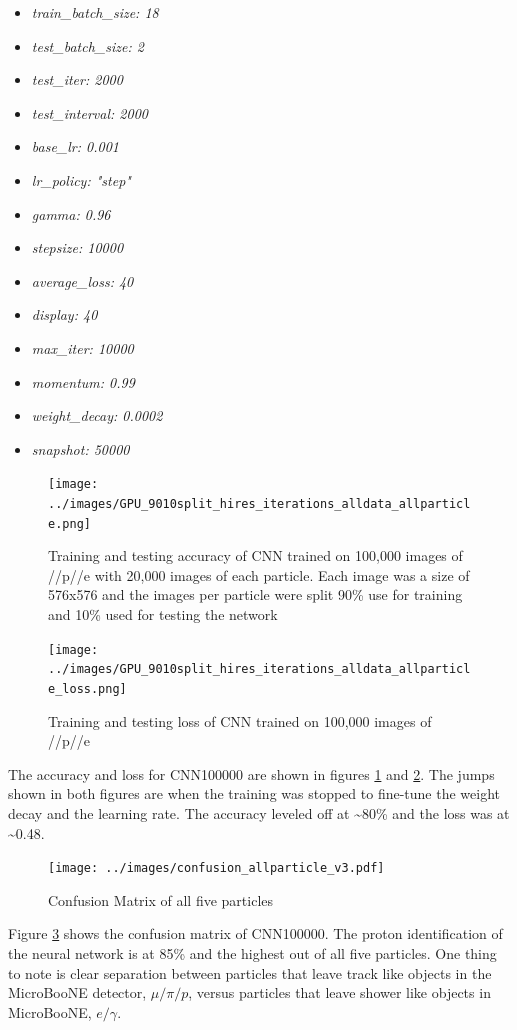 \begin{multicols}{3}
\begin{itemize}
 \item \textit{train{\_}batch{\_}size: 18}
 \item \textit{test{\_}batch{\_}size: 2}
 \item \textit{test{\_}iter: 2000}
 \item \textit{test{\_}interval: 2000}
 \item \textit{base{\_}lr: 0.001}
 \item \textit{lr{\_}policy: "step"}
 \item \textit{gamma: 0.96}
 \item \textit{stepsize: 10000}
 \item \textit{average{\_}loss: 40}
 \item \textit{display: 40}
 \item \textit{max{\_}iter: 10000}
 \item \textit{momentum: 0.99}
 \item \textit{weight{\_}decay: 0.0002}
 \item \textit{snapshot: 50000}
\end{itemize}
\end{multicols}


\begin{figure}[htp!]
\centering
\texttt{[image: ../images/GPU\_9010split\_hires\_iterations\_alldata\_allparticle.png]}
\caption{Training and testing accuracy of CNN trained on 100,000 images of \mu/\pi/p/\gamma/e with 20,000 images of each particle. Each image was a size of 576x576 and the images per particle were split 90\% use for training and 10\% used for testing the network}
\label{fig:gpuacc}
\end{figure}

\begin{figure}[htp!]
\centering
\texttt{[image: ../images/GPU\_9010split\_hires\_iterations\_alldata\_allparticle\_loss.png]}
\caption{Training and testing loss of CNN trained on 100,000 images of \mu/\pi/p/\gamma/e}
\label{fig:gpuloss}
\end{figure}
The accuracy and loss for CNN100000 are shown in figures \ref{fig:gpuacc} and \ref{fig:gpuloss}. The jumps shown in both figures are when the training was stopped to fine-tune the weight decay and the learning rate. The accuracy leveled off at \sim 80\% and the loss was at \sim 0.48. 



\begin{figure}[htp!]
\centering
\texttt{[image: ../images/confusion\_allparticle\_v3.pdf]}
\caption{Confusion Matrix of all five particles }
\label{fig:confusion100000}
\end{figure}
Figure \ref{fig:confusion100000} shows the confusion matrix of CNN100000. The proton identification of the neural network is at 85\% and the highest out of all five particles. One thing to note is clear separation between particles that leave track like objects in the MicroBooNE detector, $\mu/\pi/p$, versus particles that leave shower like objects in MicroBooNE, $e/\gamma$. 



